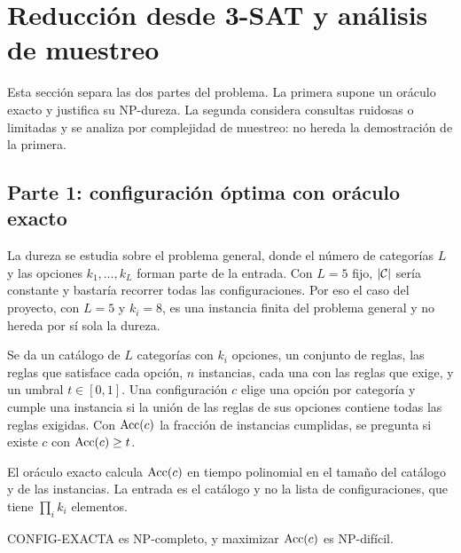 \section{Reducción desde 3-SAT y análisis de muestreo}
\label{sec:reduccion}

Esta sección separa las dos partes del problema. La primera supone un oráculo exacto
y justifica su NP-dureza. La segunda considera consultas ruidosas o limitadas y se
analiza por complejidad de muestreo: no hereda la demostración de la primera.

\subsection{Parte 1: configuración óptima con oráculo exacto}

La dureza se estudia sobre el problema general, donde el número de categorías $L$ y
las opciones $k_1,\dots,k_L$ forman parte de la entrada. Con $L=5$ fijo, $|\mathcal{C}|$ sería
constante y bastaría recorrer todas las configuraciones. Por eso el caso del proyecto,
con $L=5$ y $k_i=8$, es una instancia finita del problema general y no hereda por sí
sola la dureza.

\begin{definicion}
Se da un catálogo de $L$ categorías con $k_i$ opciones, un conjunto de reglas, las
reglas que satisface cada opción, $n$ instancias, cada una con las reglas que exige, y
un umbral $t\in[0,1]$. Una configuración $c$ elige una opción por categoría y cumple una
instancia si la unión de las reglas de sus opciones contiene todas las reglas exigidas.
Con $\operatorname{Acc}(c)$ la fracción de instancias cumplidas, se pregunta si existe $c$ con
$\operatorname{Acc}(c)\ge t$.
\end{definicion}

El oráculo exacto calcula $\operatorname{Acc}(c)$ en tiempo polinomial en el tamaño del catálogo y de
las instancias. La entrada es el catálogo y no la lista de configuraciones, que tiene
$\prod_i k_i$ elementos.

\begin{teorema}
CONFIG-EXACTA es NP-completo, y maximizar $\operatorname{Acc}(c)$ es NP-difícil.
\end{teorema}

